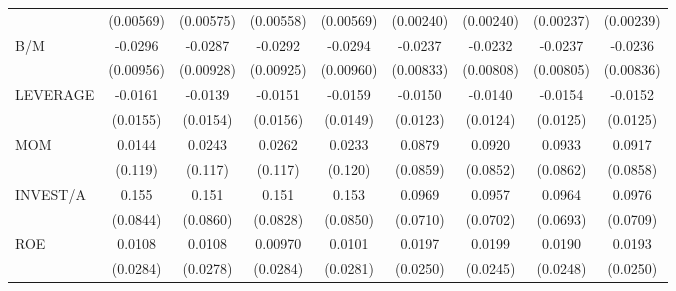 \begin{table}[htbp]
\begin{tabular}{l*{8}{c}}
                    &   (0.00569)         &   (0.00575)         &   (0.00558)         &   (0.00569)         &   (0.00240)         &   (0.00240)         &   (0.00237)         &   (0.00239)         \\
B/M                 &     -0.0296\sym{**} &     -0.0287\sym{**} &     -0.0292\sym{***}&     -0.0294\sym{**} &     -0.0237\sym{**} &     -0.0232\sym{**} &     -0.0237\sym{**} &     -0.0236\sym{**} \\
                    &   (0.00956)         &   (0.00928)         &   (0.00925)         &   (0.00960)         &   (0.00833)         &   (0.00808)         &   (0.00805)         &   (0.00836)         \\
LEVERAGE            &     -0.0161         &     -0.0139         &     -0.0151         &     -0.0159         &     -0.0150         &     -0.0140         &     -0.0154         &     -0.0152         \\
                    &    (0.0155)         &    (0.0154)         &    (0.0156)         &    (0.0149)         &    (0.0123)         &    (0.0124)         &    (0.0125)         &    (0.0125)         \\
MOM                 &      0.0144         &      0.0243         &      0.0262         &      0.0233         &      0.0879         &      0.0920         &      0.0933         &      0.0917         \\
                    &     (0.119)         &     (0.117)         &     (0.117)         &     (0.120)         &    (0.0859)         &    (0.0852)         &    (0.0862)         &    (0.0858)         \\
INVEST/A            &       0.155\sym{*}  &       0.151         &       0.151\sym{*}  &       0.153\sym{*}  &      0.0969         &      0.0957         &      0.0964         &      0.0976         \\
                    &    (0.0844)         &    (0.0860)         &    (0.0828)         &    (0.0850)         &    (0.0710)         &    (0.0702)         &    (0.0693)         &    (0.0709)         \\
ROE                 &      0.0108         &      0.0108         &     0.00970         &      0.0101         &      0.0197         &      0.0199         &      0.0190         &      0.0193         \\
                    &    (0.0284)         &    (0.0278)         &    (0.0284)         &    (0.0281)         &    (0.0250)         &    (0.0245)         &    (0.0248)         &    (0.0250)         \\

\end{tabular}
\end{table}
